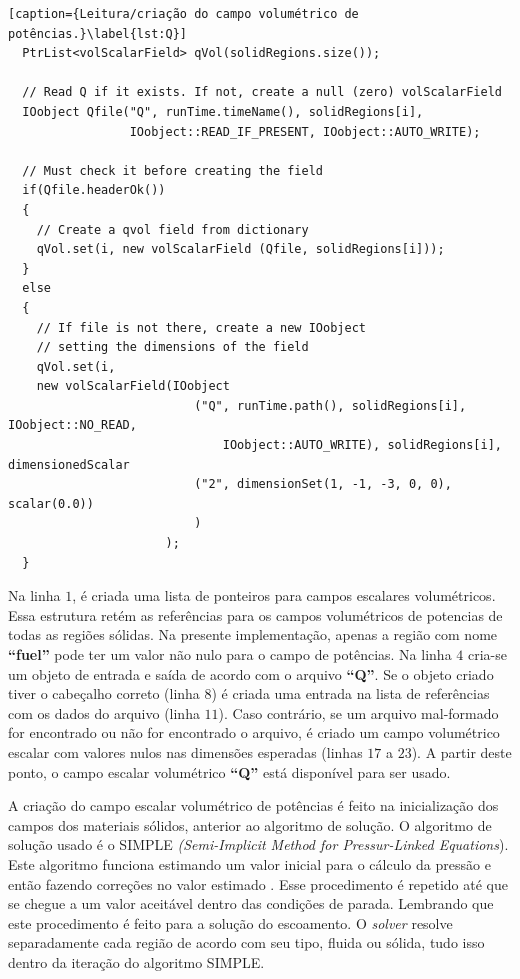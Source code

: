 \begin{lstlisting}[caption={Leitura/criação do campo volumétrico de potências.}\label{lst:Q}]
  PtrList<volScalarField> qVol(solidRegions.size());

  // Read Q if it exists. If not, create a null (zero) volScalarField
  IOobject Qfile("Q", runTime.timeName(), solidRegions[i],
                 IOobject::READ_IF_PRESENT, IOobject::AUTO_WRITE);

  // Must check it before creating the field
  if(Qfile.headerOk())
  {
    // Create a qvol field from dictionary
    qVol.set(i, new volScalarField (Qfile, solidRegions[i]));
  }
  else
  {
    // If file is not there, create a new IOobject
    // setting the dimensions of the field
    qVol.set(i,
    new volScalarField(IOobject
                          ("Q", runTime.path(), solidRegions[i], IOobject::NO_READ,
                              IOobject::AUTO_WRITE), solidRegions[i], dimensionedScalar
                          ("2", dimensionSet(1, -1, -3, 0, 0), scalar(0.0))
                          )
                      );
  }
\end{lstlisting}

Na linha $1$, é criada uma lista de ponteiros para campos escalares volumétricos. Essa estrutura
retém as referências para os campos volumétricos de potencias de todas as regiões sólidas. Na
presente implementação, apenas a região com nome \textbf{``fuel''} pode ter um valor não nulo
para o campo de potências. Na linha $4$ cria-se um objeto de entrada e saída de acordo com o
arquivo \textbf{``Q''}. Se o
objeto criado tiver o cabeçalho correto (linha $8$) é criada uma entrada na lista de referências com os
dados do arquivo (linha $11$). Caso contrário, se um arquivo mal-formado for encontrado ou
não for encontrado o arquivo, é criado um campo volumétrico escalar com valores nulos nas dimensões
esperadas (linhas $17$ a $23$). A partir deste ponto, o campo escalar volumétrico \textbf{``Q''}
está disponível para ser usado.

A criação do campo escalar volumétrico de potências é feito na inicialização dos campos dos materiais
sólidos, anterior ao algoritmo de solução. O algoritmo de solução usado é o SIMPLE
\textit{(Semi-Implicit Method for Pressur-Linked Equations}). Este algoritmo funciona
estimando um valor inicial para o cálculo da pressão e então fazendo correções no valor
estimado \cite{Versteeg2007}. Esse procedimento é repetido até que se chegue a um valor
aceitável dentro das condições de parada. Lembrando que este procedimento é feito para
a solução do escoamento. O \textit{solver} resolve separadamente cada região de acordo com seu
tipo, fluida ou sólida, tudo isso dentro da iteração do algoritmo SIMPLE.

